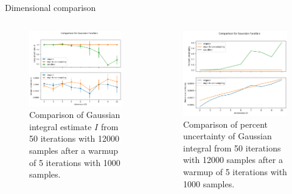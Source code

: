 \documentclass[t,handout,professionalfonts]{beamer}
\begin{document}
\begin{frame}{Dimensional comparison}
	\vspace{-0.5cm}
	\tiny
	\begin{columns}[T]
		\begin{column}[T]{0.5 \textwidth}
			\begin{figure}
				\includegraphics[width=\columnwidth]{../plots/gauss_dimensions.png}
				\caption{Comparison of  Gaussian integral estimate $I$ from 50 iterations with 12000 samples after a warmup of 5 iterations with 1000 samples. }
			\end{figure}
		\end{column}
	\begin{column}{0.5 \textwidth}
		\begin{figure}
		\includegraphics[width=\columnwidth]{../plots/gauss_dims_2.png}
		\caption{Comparison of  percent uncertainty of Gaussian integral  from 50 iterations with 12000 samples after a warmup of 5 iterations with 1000 samples. }
		\end{figure}
		\end{column}
	\end{columns}
\end{frame}
\end{document}
